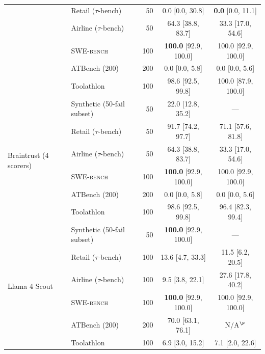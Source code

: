 \documentclass[11pt]{article}
\newcommand{\taubench}{$\tau$-bench\xspace}
\newcommand{\swebench}{\textsc{SWE-bench}\xspace}
\begin{document}
\begin{table}[t]
\begin{tabular}{@{}llrcc@{}}
  & Retail (\taubench)     & 50    & 0.0 {\scriptsize [0.0, 30.8]}              & \textbf{0.0} {\scriptsize [0.0, 11.1]} \\
  & Airline (\taubench)    & 50    & 64.3 {\scriptsize [38.8, 83.7]}            & 33.3 {\scriptsize [17.0, 54.6]} \\
  & \swebench              & 100   & \textbf{100.0} {\scriptsize [92.9, 100.0]} & 100.0 {\scriptsize [92.9, 100.0]} \\
  & ATBench (200)          & 200   & 0.0 {\scriptsize [0.0, 5.8]}               & 0.0 {\scriptsize [0.0, 5.6]} \\
  & Toolathlon             & 100   & 98.6 {\scriptsize [92.5, 99.8]}            & 100.0 {\scriptsize [87.9, 100.0]} \\
\midrule
\multirow{6}{*}{Braintrust (4 scorers)}
  & Synthetic (50-fail subset)   & 50    & 22.0 {\scriptsize [12.8, 35.2]}            & --- \\
  & Retail (\taubench)     & 50    & 91.7 {\scriptsize [74.2, 97.7]}            & 71.1 {\scriptsize [57.6, 81.8]} \\
  & Airline (\taubench)    & 50    & 64.3 {\scriptsize [38.8, 83.7]}            & 33.3 {\scriptsize [17.0, 54.6]} \\
  & \swebench              & 100   & \textbf{100.0} {\scriptsize [92.9, 100.0]} & 100.0 {\scriptsize [92.9, 100.0]} \\
  & ATBench (200)          & 200   & 0.0 {\scriptsize [0.0, 5.8]}               & 0.0 {\scriptsize [0.0, 5.6]} \\
  & Toolathlon             & 100   & 98.6 {\scriptsize [92.5, 99.8]}            & 96.4 {\scriptsize [82.3, 99.4]} \\
\midrule
\multirow{6}{*}{Llama 4 Scout}
  & Synthetic (50-fail subset)   & 50  & \textbf{100.0} {\scriptsize [92.9, 100.0]} & --- \\
  & Retail (\taubench)     & 100 & 13.6 {\scriptsize [4.7, 33.3]}             & 11.5 {\scriptsize [6.2, 20.5]} \\
  & Airline (\taubench)    & 100 & 9.5 {\scriptsize [3.8, 22.1]}              & 27.6 {\scriptsize [17.8, 40.2]} \\
  & \swebench              & 100  & \textbf{100.0} {\scriptsize [92.9, 100.0]} & 100.0 {\scriptsize [92.9, 100.0]} \\
  & ATBench (200)          & 200 & 70.0 {\scriptsize [63.1, 76.1]}            & N/A$^\P$ \\
  & Toolathlon             & 100 & 6.9 {\scriptsize [3.0, 15.2]}             & 7.1 {\scriptsize [2.0, 22.6]} \\

\end{tabular}
\end{table}
\end{document}
